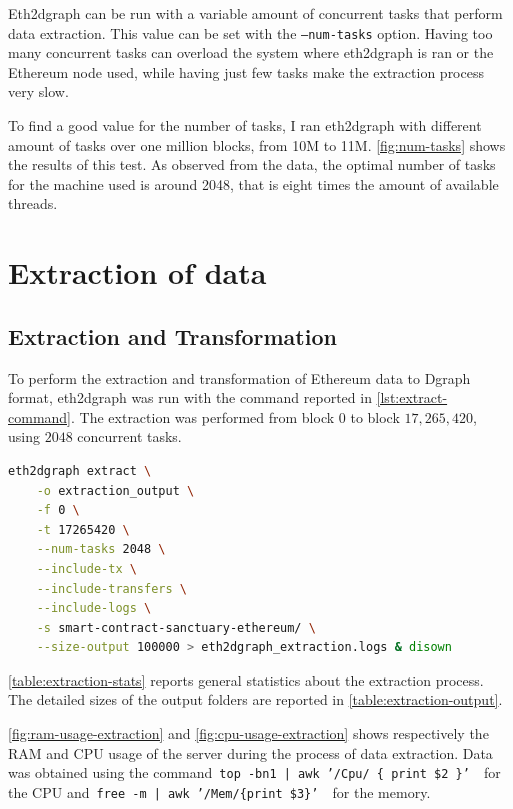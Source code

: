 Eth2dgraph can be run with a variable amount of concurrent tasks that perform data extraction. This value can be set with the {\tt --num-tasks} option. Having too many concurrent tasks can overload the system where eth2dgraph is ran or the Ethereum node used, while having just few tasks make the extraction process very slow.

To find a good value for the number of tasks, I ran eth2dgraph with different amount of tasks over one million blocks, from 10M to 11M. \cref{fig:num-tasks} shows the results of this test. As observed from the data, the optimal number of tasks for the machine used is around 2048, that is eight times the amount of available threads.

\section{Extraction of data}

\subsection{Extraction and Transformation}

To perform the extraction and transformation of Ethereum data to Dgraph format, eth2dgraph was run with the command reported in \cref{lst:extract-command}. The extraction was performed from block $0$ to block $17,265,420$, using $2048$ concurrent tasks. 

\begin{lstlisting}[language=Bash,caption={Eth2dgraph extraction command used.},label={lst:extract-command},captionpos=b,numbers=none]
eth2dgraph extract \
    -o extraction_output \
    -f 0 \
    -t 17265420 \
    --num-tasks 2048 \
    --include-tx \
    --include-transfers \
    --include-logs \
    -s smart-contract-sanctuary-ethereum/ \
    --size-output 100000 > eth2dgraph_extraction.logs & disown
\end{lstlisting}

\cref{table:extraction-stats} reports general statistics about the extraction process. The detailed sizes of the output folders are reported in \cref{table:extraction-output}.

\cref{fig:ram-usage-extraction} and \cref{fig:cpu-usage-extraction} shows respectively the RAM and CPU usage of the server during the process of data extraction. Data was obtained using the command~{\tt top -bn1 | awk '/Cpu/ \{ print \$2 \}' }~for the CPU and~{\tt free -m | awk '/Mem/\{print \$3\}' }~for the memory.
  

